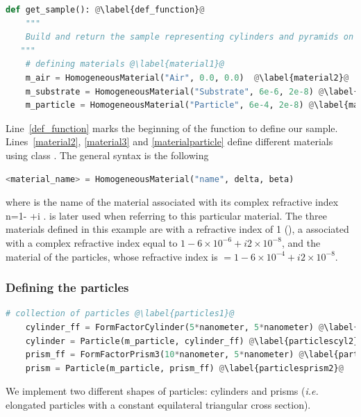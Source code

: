\begin{lstlisting}[language=python, style=eclipseboxed,name=ex1,nolol]
def get_sample(): @\label{def_function}@
    """
    Build and return the sample representing cylinders and pyramids on top of substrate without interference.
   """
    # defining materials @\label{material1}@
    m_air = HomogeneousMaterial("Air", 0.0, 0.0)  @\label{material2}@
    m_substrate = HomogeneousMaterial("Substrate", 6e-6, 2e-8) @\label{material3}@
    m_particle = HomogeneousMaterial("Particle", 6e-4, 2e-8) @\label{materialparticle}@

\end{lstlisting}
Line~\ref{def_function} marks the beginning of the
function to define our sample. Lines~\ref{material2}, \ref{material3} and \ref{materialparticle} define different
materials using class . The general syntax is the following 
\begin{lstlisting}[language=python, style=eclipse,numbers=none]
<material_name> = HomogeneousMaterial("name", delta, beta)
\end{lstlisting}
where  is the name of the
material associated with its complex refractive index
n=1- +i .  is later used when
referring to this particular material. The three materials defined in this example are  with a refractive
index of 1 (), a  associated with a complex refractive index
equal to $1-6\times 10^{-6} +i2\times 10^{-8} $, and the material of the particles, whose refractive index is $=1-6\times 10^{-4}+i2\times 10^{-8}$.

\subsubsection{Defining the particles}
\begin{lstlisting}[language=python,style=eclipseboxed,name=ex1,nolol]
    # collection of particles @\label{particles1}@
    cylinder_ff = FormFactorCylinder(5*nanometer, 5*nanometer) @\label{particlescyl1}@
    cylinder = Particle(m_particle, cylinder_ff) @\label{particlescyl2}@
    prism_ff = FormFactorPrism3(10*nanometer, 5*nanometer) @\label{particlesprism1}@
    prism = Particle(m_particle, prism_ff) @\label{particlesprism2}@
\end{lstlisting}
We implement two different shapes of particles: cylinders and
prisms (\textit{i.e.} elongated particles with a constant equilateral triangular cross section).
 
